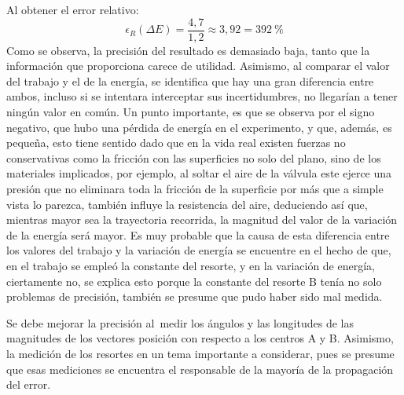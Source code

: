 \documentclass[../main.tex]{subfiles}
\begin{document}
Al obtener el error relativo:
\begin{equation*}
  \epsilon_R (\Delta E) = \frac{4,7}{1,2} \approx 3,92 = \qty{392}{\percent}
\end{equation*}
Como se observa, la precisión del resultado es demasiado baja, tanto que la información que proporciona carece de utilidad. Asimismo, al comparar el valor del trabajo y el de la energía, se identifica que hay una gran diferencia entre ambos, incluso si se intentara interceptar sus incertidumbres, no llegarían a tener ningún valor en común. Un punto importante, es que se observa por el signo negativo, que hubo una pérdida de energía en el experimento, y que, además, es pequeña, esto tiene sentido dado que en la vida real existen fuerzas no conservativas como la fricción con las superficies no solo del plano, sino de los materiales implicados, por ejemplo, al soltar  el aire de la válvula  este ejerce una presión que no eliminara  toda la fricción de la superficie por más que a simple vista lo parezca, también influye la resistencia del aire, deduciendo así que, mientras mayor sea la trayectoria recorrida, la magnitud del valor de la variación de la energía será mayor.
Es muy probable que la causa de esta diferencia entre los valores del trabajo y la variación de energía se encuentre en el hecho de que, en el trabajo se empleó la constante del resorte, y en la variación de energía, ciertamente no, se explica esto porque la constante del resorte B tenía no solo problemas de precisión, también se presume que pudo haber sido mal medida.

Se debe mejorar la precisión al medir los ángulos y las longitudes de las magnitudes de los vectores posición con respecto a los centros A y B.
Asimismo, la medición de los resortes en un tema importante a considerar, pues se presume que esas mediciones se encuentra el responsable de la mayoría de la propagación del error.
\end{document}
